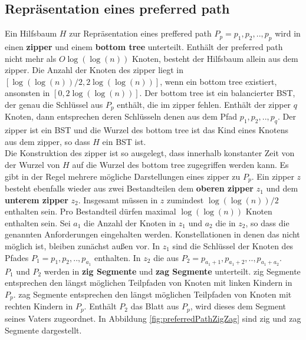 \documentclass[a4paper,12pt]{article}
\begin{document}
\subsection{Repräsentation eines preferred path}
Ein Hilfsbaum $H$ zur Repräsentation eines preffered path $P_p = p_1,p_2,..,p_p$ wird in einen \textbf{zipper} und einem \textbf{bottom tree} unterteilt. Enthält der preferred path nicht mehr als $O\log\left(\log\left(n\right)\right)$ Knoten, besteht der Hilfsbaum allein aus dem zipper. Die Anzahl der Knoten des zipper liegt in \\$\left[\log\left(\log\left(n\right)\right) / 2, 2 \log\left(\log\left(n\right)\right)  \right] $, wenn ein bottom tree existiert, ansonsten in $\left[0, 2 \log\left(\log\left(n\right)\right)  \right] $. Der bottom tree ist ein balancierter BST, der genau die Schlüssel aus $P_p$ enthält, die im zipper fehlen. Enthält der zipper $q$ Knoten, dann entsprechen deren Schlüsseln denen aus dem Pfad $p_1, p_2,..,p_q$. Der zipper ist ein BST und die Wurzel des bottom tree ist das Kind eines Knotens aus dem zipper, so dass $H$ ein BST ist. \\
 Die Konstruktion des zipper ist so ausgelegt, dass innerhalb konstanter Zeit von der Wurzel von $H$ auf die Wurzel des bottom tree zugegriffen werden kann. Es gibt in der Regel mehrere mögliche Darstellungen eines zipper zu $P_p$. Ein zipper $z$ besteht ebenfalls wieder aus zwei Bestandteilen dem \textbf{oberen zipper} $z_1$  und dem \textbf{unterem zipper} $z_2$. Insgesamt müssen in $z$ zumindest  $\log\left(\log\left(n\right)\right) / 2$ enthalten sein. Pro Bestandteil dürfen maximal $\log\left(\log\left(n\right)\right)$ Knoten enthalten sein. Sei $a_1$ die Anzahl der Knoten in $z_1$ und $a_2$ die in $z_2$, so dass die genannten Anforderungen eingehalten werden. Konstellationen in denen das nicht möglich ist, bleiben zunächst außen vor. In $z_1$ sind die Schlüssel der Knoten des Pfades $P_1 = p_1, p_2,.., p_{a_1}$ enthalten. In $z_2$ die aus $P_2 = p_{a_1 + 1}, p_{a_1 + 2},..,p_{a_1 + a_2} $. \\
 $P_1$ und $P_2$ werden in \textbf{zig Segmente} und \textbf{zag Segmente} unterteilt. zig Segmente entsprechen den längst möglichen Teilpfaden von Knoten mit linken Kindern in $P_p$. zag Segmente entsprechen den längst möglichen Teilpfaden von Knoten mit rechten Kindern in $P_p$. Enthält $P_2$ das Blatt aus $P_p$, wird dieses dem Segment seines Vaters zugeordnet. In Abbildung  \ref{fig:preferredPathZigZag} sind zig und zag Segmente dargestellt.
\end{document}
